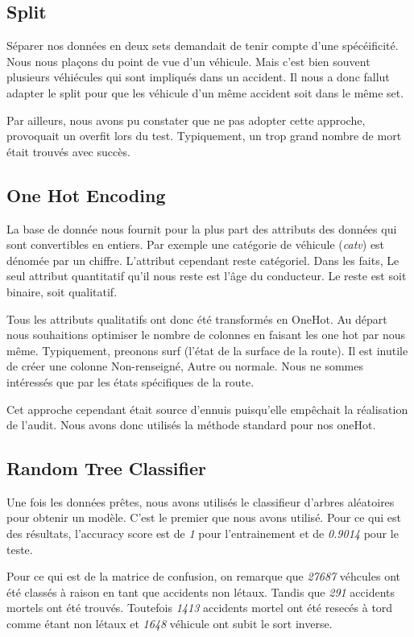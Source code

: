 \documentclass{article}
\begin{document}
    \subsection{Split}
    Séparer nos données en deux sets demandait de tenir compte d'une spécéificité. Nous nous plaçons du point de vue d'un véhicule. 
    Mais c'est bien souvent plusieurs véhiécules qui sont impliqués dans un accident. Il nous a donc fallut adapter le split pour que 
    les véhicule d'un même accident soit dans le même set. 
    
    Par ailleurs, nous avons pu constater que ne pas adopter cette approche, provoquait un overfit lors du test. Typiquement, un trop 
    grand nombre de mort était trouvés avec succès.

    \subsection{One Hot Encoding}
    La base de donnée nous fournit pour la plus part des attributs des données qui sont convertibles en entiers. 
    Par exemple une catégorie de véhicule (\textit{catv}) est dénomée par un chiffre. L'attribut cependant reste catégoriel. Dans les faits, 
    Le seul attribut quantitatif qu'il nous reste est l'âge du conducteur. 
    Le reste est soit binaire, soit qualitatif. 
    
    Tous les attributs qualitatifs ont donc été transformés en OneHot. Au départ nous souhaitions optimiser le nombre de colonnes en 
    faisant les one hot par nous même. Typiquement, preonons surf (l'état de la surface de la route). Il est inutile de créer une colonne 
    Non-renseigné, Autre ou normale. Nous ne sommes intéressés que par les états spécifiques de la route. 

    Cet approche cependant était source d'ennuis puisqu'elle empêchait la réalisation de l'audit. Nous avons donc utilisés la méthode 
    standard pour nos oneHot. 

    \subsection{Random Tree Classifier}
    Une fois les données prêtes, nous avons utilisés le classifieur d'arbres aléatoires pour obtenir un modèle. C'est le premier que nous 
    avons utilisé. Pour ce qui est des résultats, l'accuracy score est de \textit{1} pour l'entrainement et de \textit{0.9014} pour le teste.
    
    Pour ce qui est de la matrice de confusion, on remarque que \textit{27687} véhcules ont été classés à raison en tant que accidents non létaux.
    Tandis que \textit{291} accidents mortels ont été trouvés. Toutefois \textit{1413} accidents mortel ont été resecés à tord comme étant 
    non létaux et \textit{1648} véhicule ont subit le sort inverse. 
\end{document}
